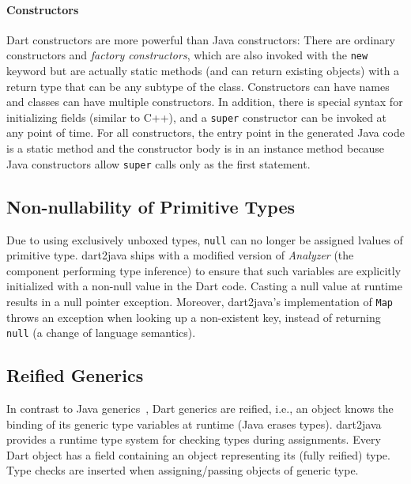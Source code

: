 \documentclass[sigplan]{acmart}
\begin{document}
\paragraph{Constructors}
Dart constructors are more powerful than Java constructors: There are ordinary constructors and \emph{factory constructors}, which are also invoked with the \texttt{new} keyword but are actually static methods (and can return existing objects) with a return type that can be any subtype of the class. Constructors can have names and classes can have multiple constructors. In addition, there is special syntax for initializing fields (similar to C++), and a \texttt{super} constructor can be invoked at any point of time. For all constructors, the entry point in the generated Java code is a static method and the constructor body is in an instance method because Java constructors allow \texttt{super} calls only as the first statement.

\subsection{Non-nullability of Primitive Types}
Due to using exclusively unboxed types, \texttt{null} can no longer be assigned lvalues of primitive type. dart2java ships with a modified version of \emph{Analyzer} (the component performing type inference) to ensure that such variables are explicitly initialized with a non-null value in the Dart code. Casting a null value at runtime results in a null pointer exception. Moreover, dart2java's implementation of \texttt{Map} throws an exception when looking up a non-existent key, instead of returning \texttt{null} (a change of language semantics).

\subsection{Reified Generics}
In contrast to Java generics~\cite{Bracha:1998:MFS:286936.286957}, Dart generics are reified, i.e., an object knows the binding of its generic type variables at runtime (Java erases types). dart2java provides a runtime type system for checking types during assignments. Every Dart object has a field containing an object representing its (fully reified) type. Type checks are inserted when assigning/passing objects of generic type. 
\end{document}
